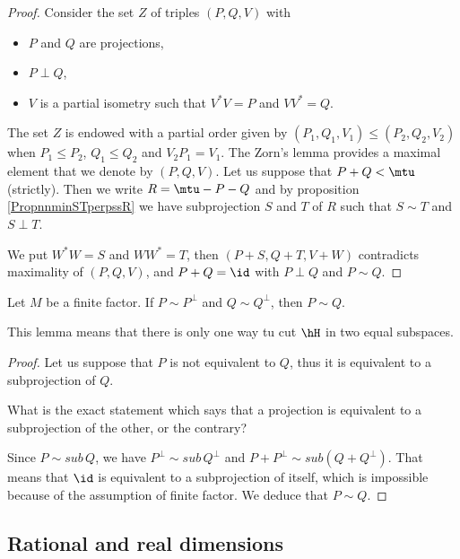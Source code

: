 \begin{proof}
Consider the set \( Z\) of triples \( (P,Q,V)\) with
\begin{itemize}
    \item \( P\) and \( Q\) are projections,
    \item \( P\perp Q\),
    \item
        \( V\) is a partial isometry such that \( V^*V=P\) and \( VV^*=Q\).
\end{itemize}
The set $Z$ is endowed with a partial order given by $(P_1,Q_1,V_1)\leq (P_2,Q_2,V_2)$ when $P_1\leq P_2$, $Q_1\leq Q_2$ and $V_2P_1=V_1$. The Zorn's lemma provides a maximal element that we denote by $(P,Q,V)$. Let us suppose that $P+Q<\mtu$ (strictly). Then we write $R=\mtu-P-Q$ and by proposition \ref{PropnnminSTperpssR} we have subprojection $S$ and $T$ of $R$ such that $S\sim T$ and $S\perp T$. 

We put $W^*W=S$ and $WW^*=T$, then $(P+S,Q+T,V+W)$ contradicts maximality of $(P,Q,V)$, and $P+Q=\id$ with $P\perp Q$ and $P\sim Q$.
\end{proof}

\begin{lemma}		\label{LemfinfacPPQQPsimQ}
Let $M$ be a finite factor. If $P\sim P^{\perp}$ and $Q\sim Q^{\perp}$, then $P\sim Q$.
\end{lemma}

This lemma means that there is only one way tu cut $\hH$ in two equal subspaces.

\begin{proof}
Let us suppose that $P$ is not equivalent to $Q$, thus it is equivalent to a subprojection of $Q$.

\begin{probleme}
What is the exact statement which says that a projection is equivalent to a subprojection of the other, or the contrary?
\end{probleme}

Since $P\sim sub\, Q$, we have $P^{\perp}\sim sub\, Q^{\perp}$ and $P+P^{\perp}\sim sub(Q+Q^{\perp})$. That means that $\id$ is equivalent to a subprojection of itself, which is impossible because of the assumption of finite factor. We deduce that $P\sim Q$.
\end{proof}

					\subsection{Rational and real dimensions}
\label{SubSecRationalRealDim}

